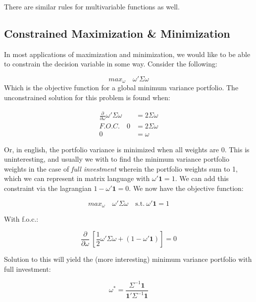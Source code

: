 \documentclass[]{book}
\theoremstyle{definition}
\theoremstyle{definition}
\theoremstyle{definition}
\theoremstyle{remark}
\begin{document}
There are similar rules for multivariable functions as well.

\subsection*{Constrained Maximization \&
Minimization}\label{constrained-maximization-minimization}

In most applications of maximization and minimization, we would like to
be able to constrain the decision variable in some way. Consider the
following:

\[
max_\omega \quad \omega' \Sigma \omega
\] Which is the objective function for a global minimum variance
portfolio. The unconstrained solution for this problem is found when:

\begin{align*}
\frac{\partial}{\partial \omega} \omega' \Sigma \omega &= 2 \Sigma \omega \\
F.O.C. \quad 0 &= 2 \Sigma \omega \\
0 &= \omega
\end{align*}

Or, in english, the portfolio variance is minimized when all weights are
0. This is uninteresting, and usually we with to find the minimum
variance portfolio weights in the case of \emph{full investment} wherein
the portfolio weights sum to 1, which we can represent in matrix
language with \(\omega' \mathbf{1} = 1\). We can add this constraint via
the lagrangian \(1 - \omega' \mathbf{1} = 0\). We now have the objective
function:

\[
max_\omega \quad \omega' \Sigma \omega \quad \text{s.t.} \ \omega' \mathbf{1} = 1
\]

With f.o.c.:

\[
\frac{\partial}{\partial \omega} \ [\frac{1}{2} \omega' \Sigma \omega + (1 - \omega' \mathbf{1})] = 0
\]

Solution to this will yield the (more interesting) minimum variance
portfolio with full investment:

\[
\omega^* = \frac{\Sigma^{-1} \mathbf{1}}{\mathbf{1}' \Sigma^{-1} \mathbf{1}}
\]


\end{document}
